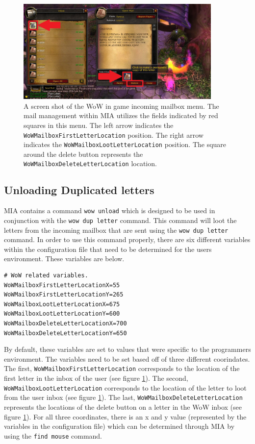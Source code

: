 \begin{figure}[h]
	\centering
	\includegraphics[width=0.9\textwidth]{images/WoWScrnShot_040518_115947b.jpg}
	\caption{A screen shot of the WoW in game incoming mailbox menu. The mail management within MIA utilizes the fields indicated by red squares in this menu. The left arrow indicates the \texttt{WoWMailboxFirstLetterLocation} position. The right arrow indicates the \texttt{WoWMailboxLootLetterLocation} position. The square around the delete button represents the \texttt{WoWMailboxDeleteLetterLocation} location.} \label{wow mailbox receive}
\end{figure}

\subsection{Unloading Duplicated letters}

MIA contains a command \texttt{wow unload} which is designed to be used in conjunction with the \texttt{wow dup letter} command. This command will loot the letters from the incoming mailbox that are sent using the \texttt{wow dup letter} command. In order to use this command properly, there are six different variables within the configuration file that need to be determined for the users environment. These variables are below.

\begin{lstlisting}
# WoW related variables.
WoWMailboxFirstLetterLocationX=55
WoWMailboxFirstLetterLocationY=265
WoWMailboxLootLetterLocationX=675
WoWMailboxLootLetterLocationY=600
WoWMailboxDeleteLetterLocationX=700
WoWMailboxDeleteLetterLocationY=650
\end{lstlisting}

By default, these variables are set to values that were specific to the programmers environment. The variables need to be set based off of three different coorindates. The first, \texttt{WoWMailboxFirstLetterLocation} corresponds to the location of the first letter in the inbox of the user (see figure \ref{wow mailbox receive}). The second, \texttt{WoWMailboxLootLetterLocation} corresponds to the location of the letter to loot from the user inbox (see figure \ref{wow mailbox receive}). The last, \texttt{WoWMailboxDeleteLetterLocation} represents the locations of the delete button on a letter in the WoW inbox (see figure \ref{wow mailbox receive}).  For all three coordinates, there is an x and y value (represented by the variables in the configuration file) which can be determined through MIA by using the \texttt{find mouse} command.